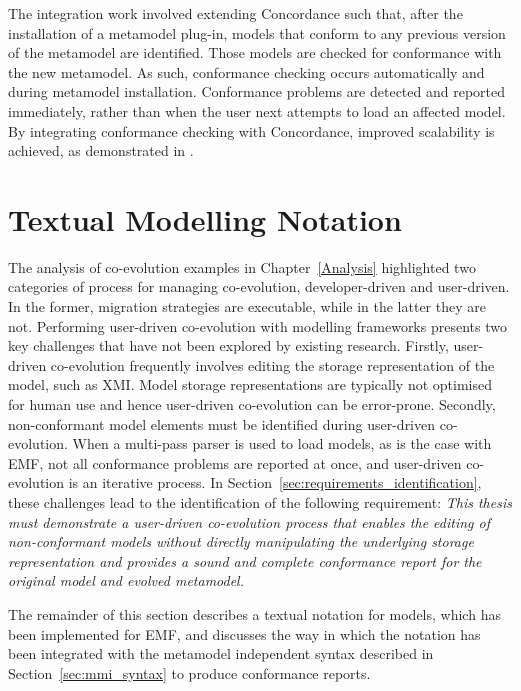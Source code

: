 The integration work involved extending Concordance such that, after the installation of a metamodel plug-in, models that conform to any previous version of the metamodel are identified. Those models are checked for conformance with the new metamodel. As such, conformance checking occurs automatically and during metamodel installation. Conformance problems are detected and reported immediately, rather than when the user next attempts to load an affected model. By integrating conformance checking with Concordance, improved scalability is achieved, as demonstrated in \cite{rose10concordance}. 


\section{Textual Modelling Notation}
\label{sec:notation}
The analysis of co-evolution examples in Chapter~\ref{Analysis} highlighted two categories of process for managing co-evolution, developer-driven and user-driven. In the former, migration strategies are executable, while in the latter they are not. Performing user-driven co-evolution with modelling frameworks presents two key challenges that have not been explored by existing research. Firstly, user-driven co-evolution frequently involves editing the storage representation of the model, such as XMI. Model storage representations are typically not optimised for human use and hence user-driven co-evolution can be error-prone. Secondly, non-conformant model elements must be identified during user-driven co-evolution. When a multi-pass parser is used to load models, as is the case with EMF, not all conformance problems are reported at once, and user-driven co-evolution is an iterative process. In Section~\ref{sec:requirements_identification}, these challenges lead to the identification of the following requirement: \emph{This thesis must demonstrate a user-driven co-evolution process that enables the editing of non-conformant models without directly manipulating the underlying storage representation and provides a sound and complete conformance report for the original model and evolved metamodel.}

The remainder of this section describes a textual notation for models, which has been implemented for EMF, and discusses the way in which the notation has been integrated with the metamodel independent syntax described in Section~\ref{sec:mmi_syntax} to produce conformance reports. 


